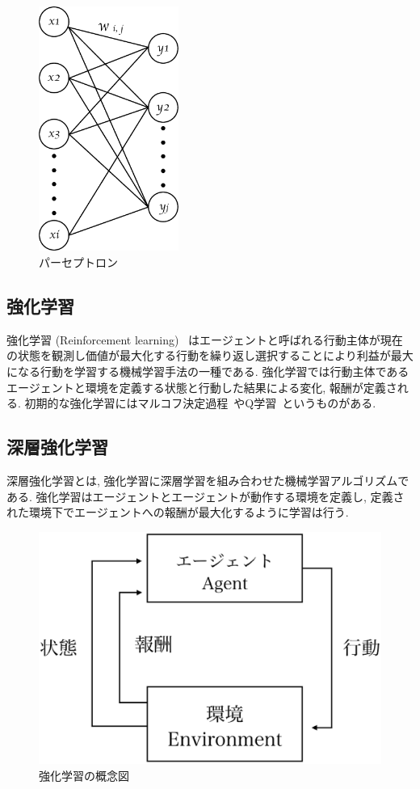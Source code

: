 \begin{figure}[H]
    \centering
    \includegraphics[clip,height = 8.0cm]{assets/perceptron.eps}
    \caption{パーセプトロン}  \label{sample}
\end{figure}

\subsection{強化学習}

強化学習 (Reinforcement learning) ~\cite{ReinforcementLearning}はエージェントと呼ばれる行動主体が現在の状態を観測し価値が最大化する行動を繰り返し選択することにより利益が最大になる行動を学習する機械学習手法の一種である.
強化学習では行動主体であるエージェントと環境を定義する状態と行動した結果による変化, 報酬が定義される.
初期的な強化学習にはマルコフ決定過程~\cite{ReinforcementLearning}やQ学習~\cite{QL}というものがある.

\subsection{深層強化学習}

深層強化学習とは, 強化学習に深層学習を組み合わせた機械学習アルゴリズムである.
強化学習はエージェントとエージェントが動作する環境を定義し, 定義された環境下でエージェントへの報酬が最大化するように学習は行う.

\begin{figure}[H]
    \centering
    \includegraphics[clip,width = 12.0cm]{assets/reinforcement_learning.eps}
    \caption{強化学習の概念図}  \label{sample}
\end{figure}

